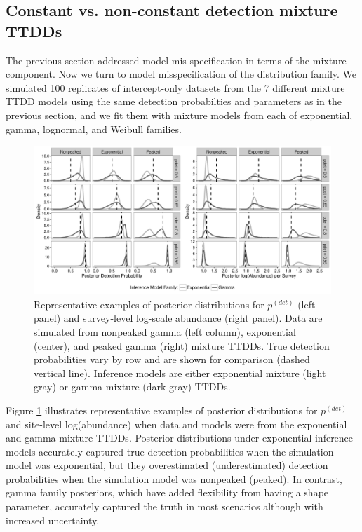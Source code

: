 \documentclass[12pt]{article}
\newcommand{\pdet}{p^{(det)}}
\begin{document}
\subsection{Constant vs. non-constant detection mixture TTDDs}\label{sec:family}

The previous section addressed model mis-specification in terms of the mixture component. 
Now we turn to model misspecification of the distribution family. 
We simulated 100 replicates of intercept-only datasets from the 7 different mixture TTDD models using the same detection probabilties and parameters as in the previous section, and we fit them with mixture models from each of exponential, gamma, lognormal, and Weibull families.

\begin{figure}\centering
\includegraphics[width=\textwidth]{"Sims/SimZero/Posteriors_Families_draft"}
\caption{\label{fig:sim2typical} 
Representative examples of posterior distributions for $\pdet$ (left panel) and survey-level log-scale abundance (right panel).
Data are simulated from nonpeaked gamma (left column), exponential (center), and peaked gamma (right) mixture TTDDs.
True detection probabilities vary by row and are shown for comparison (dashed vertical line).
Inference models are either exponential mixture (light gray) or gamma mixture (dark gray) TTDDs.
}
\end{figure}

Figure \ref{fig:sim2typical} illustrates representative examples of posterior distributions for $\pdet$ and site-level log(abundance) when data and models were from the exponential and gamma mixture TTDDs. 
Posterior distributions under exponential inference models accurately captured true detection probabilities when the simulation model was exponential, but they overestimated (underestimated) detection probabilities when the simulation model was nonpeaked (peaked).
In contrast, gamma family posteriors, which have added flexibility from having a shape parameter, accurately captured the truth in most scenarios although with increased uncertainty. 
\end{document}
